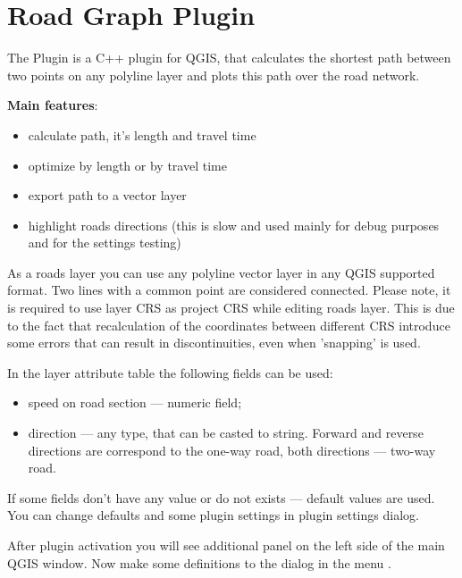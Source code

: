 
\section{Road Graph Plugin}\label{sec:roadgraph}



The  Plugin is a C++ plugin for QGIS, that calculates the shortest path 
between two points on any polyline layer and plots this path over the road network. 

\textbf{Main features}:

\begin{itemize}
\item calculate path, it's length and travel time
\item optimize by length or by travel time
\item export path to a vector layer
\item highlight roads directions (this is slow and used mainly for debug purposes and for the settings 
testing)
\end{itemize}

As a roads layer you can use any polyline vector layer in any QGIS supported format. Two lines with 
a common point are considered connected. Please note, it is required to use layer CRS as project CRS 
while editing roads layer. This is due to the fact that recalculation of the coordinates between 
different CRS introduce some errors that can result in discontinuities, even when 'snapping' is used.

In the layer attribute table the following fields can be used:

\begin{itemize}
\item speed on road section — numeric field;
\item direction — any type, that can be casted to string. Forward and reverse directions are correspond 
to the one-way road, both directions — two-way road.
\end{itemize}

If some fields don't have any value or do not exists — default values are used. You can change defaults 
and some plugin settings in plugin settings dialog.


After plugin activation you will see additional panel on the left side of the main QGIS window. Now 
make some definitions to the  dialog in the menu 
 \arrow {}. 

